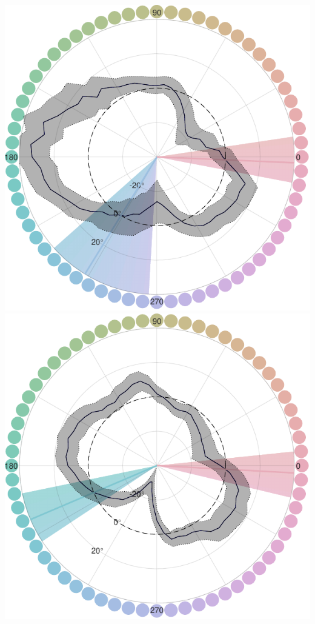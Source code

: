 \begin{minipage}{0.9\textwidth}
\includegraphics[width=0.49\linewidth]{../../../Outputs/Paper/Figures/working/7_IndiData_MixMod/210428--210609_Buster_categorybias2_230225.pdf}
\label{fig:BiasCurvesBuster}
\hfill
\includegraphics[width=0.49\linewidth]{../../../Outputs/Paper/Figures/working/7_IndiData_MixMod/220322--220823_Morty_categorybias2_230225.pdf}
\label{fig:BiasCurvesMorty}

\label{fig:BiasCurvesIndividual}
\end{minipage}


\begin{minipage}{0.9\textwidth}


\label{fig:SimilarityMatrixPollux}
\hfill
    
\label{fig:SimilarityMatrixCastor}

    
\label{fig:SimilarityMatrixBuster}
\hfill
    
\label{fig:SimilarityMatrixMorty}

\label{fig:SimilarityMatrixIndividual}
\end{minipage}

